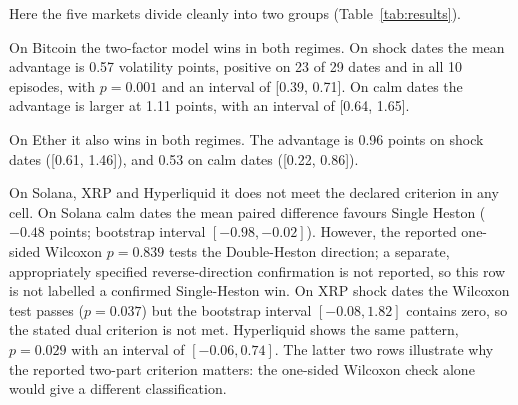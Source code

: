 \documentclass[runningheads]{llncs}
\begin{document}
Here the five markets divide cleanly into two groups
(Table~\ref{tab:results}).

On Bitcoin the two-factor model wins in both regimes. On shock dates the
mean advantage is 0.57 volatility points, positive on 23 of 29 dates and
in all 10 episodes, with $p = 0.001$ and an interval of [0.39, 0.71]. On
calm dates the advantage is larger at 1.11 points, with an interval of
[0.64, 1.65].

On Ether it also wins in both regimes. The advantage is 0.96 points on
shock dates ([0.61, 1.46]), and 0.53 on calm dates ([0.22, 0.86]).

On Solana, XRP and Hyperliquid it does not meet the declared criterion
in any cell. On Solana calm dates the mean paired difference favours
Single Heston ($-0.48$ points; bootstrap interval $[-0.98, -0.02]$).
However, the reported one-sided Wilcoxon $p = 0.839$ tests the
Double-Heston direction; a separate, appropriately specified
reverse-direction confirmation is not reported, so this row is not
labelled a confirmed Single-Heston win. On XRP shock dates the Wilcoxon
test passes ($p = 0.037$) but the bootstrap interval $[-0.08, 1.82]$
contains zero, so the stated dual criterion is not met. Hyperliquid
shows the same pattern, $p = 0.029$ with an interval of
$[-0.06, 0.74]$. The latter two rows illustrate why the reported
two-part criterion matters: the one-sided Wilcoxon check alone would
give a different classification.
\end{document}
